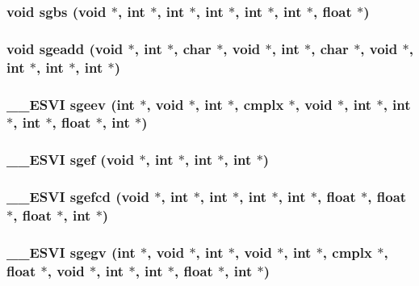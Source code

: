 \subsubsection{\setlength{\rightskip}{0pt plus 5cm}void sgbs (void $\ast$, int $\ast$, int $\ast$, int $\ast$, int $\ast$, int $\ast$, float $\ast$)}\label{essl_8h_d023386b7edee601e2481e869871aa93}


\subsubsection{\setlength{\rightskip}{0pt plus 5cm}void sgeadd (void $\ast$, int $\ast$, char $\ast$, void $\ast$, int $\ast$, char $\ast$, void $\ast$, int $\ast$, int $\ast$, int $\ast$)}\label{essl_8h_b2fadbbd9d242a678b6758f400c0846b}


\subsubsection{\setlength{\rightskip}{0pt plus 5cm}\_\-\_\-ESVI sgeev (int $\ast$, void $\ast$, int $\ast$, {\bf cmplx} $\ast$, void $\ast$, int $\ast$, int $\ast$, int $\ast$, float $\ast$, int $\ast$)}\label{essl_8h_411040128aab852fe97d9f3bed2b6071}


\subsubsection{\setlength{\rightskip}{0pt plus 5cm}\_\-\_\-ESVI sgef (void $\ast$, int $\ast$, int $\ast$, int $\ast$)}\label{essl_8h_cd2df761bcf10f558408c268b9ffc489}


\subsubsection{\setlength{\rightskip}{0pt plus 5cm}\_\-\_\-ESVI sgefcd (void $\ast$, int $\ast$, int $\ast$, int $\ast$, int $\ast$, float $\ast$, float $\ast$, float $\ast$, int $\ast$)}\label{essl_8h_7010b993a025c9cc0c8668eca7fd2490}


\subsubsection{\setlength{\rightskip}{0pt plus 5cm}\_\-\_\-ESVI sgegv (int $\ast$, void $\ast$, int $\ast$, void $\ast$, int $\ast$, {\bf cmplx} $\ast$, float $\ast$, void $\ast$, int $\ast$, int $\ast$, float $\ast$, int $\ast$)}\label{essl_8h_dea3a39b21759c0447da1cb45c425890}


